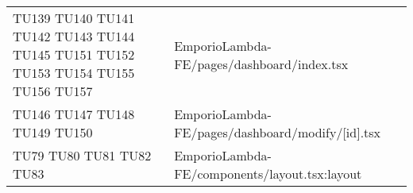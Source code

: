 {\begin{longtable}{C{2cm} C{12.8cm}}
TU139 \newline TU140 \newline TU141 \newline TU142 \newline TU143 \newline TU144 \newline TU145 \newline TU151 \newline TU152 \newline TU153 \newline TU154 \newline TU155 \newline TU156 \newline TU157 & EmporioLambda-FE/pages/dashboard/index.tsx\\

TU146 \newline TU147 \newline TU148 \newline TU149 \newline TU150 & EmporioLambda-FE/pages/dashboard/modify/[id].tsx\\



TU79 \newline TU80 \newline TU81 \newline TU82 \newline TU83 & EmporioLambda-FE/components/layout.tsx:layout





\end{longtable}

}

